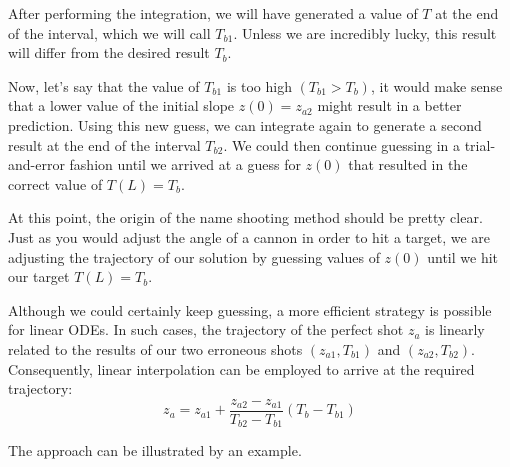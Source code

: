 \documentclass[../main.tex]{subfiles}
\begin{document}
After performing the integration, we will have generated a value of $T$ at the end of the interval, which we will call $T_{b 1}$. Unless we are incredibly lucky, this result will differ from the desired result $T_{b}$.

Now, let's say that the value of $T_{b 1}$ is too high $\left(T_{b 1}>T_{b}\right)$, it would make sense that a lower value of the initial slope $z(0)=z_{a 2}$ might result in a better prediction. Using this new guess, we can integrate again to generate a second result at the end of the interval $T_{b 2}$. We could then continue guessing in a trial-and-error fashion until we arrived at a guess for $z(0)$ that resulted in the correct value of $T(L)=T_{b}$.

At this point, the origin of the name shooting method should be pretty clear. Just as you would adjust the angle of a cannon in order to hit a target, we are adjusting the trajectory of our solution by guessing values of $z(0)$ until we hit our target $T(L)=T_{b}$.

Although we could certainly keep guessing, a more efficient strategy is possible for linear ODEs. In such cases, the trajectory of the perfect shot $z_{a}$ is linearly related to the results of our two erroneous shots $\left(z_{a 1}, T_{b 1}\right)$ and $\left(z_{a 2}, T_{b 2}\right)$. Consequently, linear interpolation can be employed to arrive at the required trajectory:
\begin{equation}
    \tag{24.11}
    z_{a}=z_{a 1}+\frac{z_{a 2}-z_{a 1}}{T_{b 2}-T_{b 1}}\left(T_{b}-T_{b 1}\right)
\end{equation}

The approach can be illustrated by an example.
\end{document}
